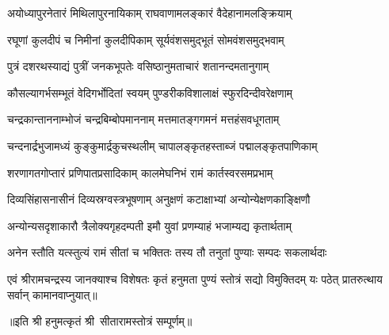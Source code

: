 
\twolineshloka
{अयोध्यापुरनेतारं मिथिलापुरनायिकाम्}
{राघवाणामलङ्कारं वैदेहानामलङ्क्रियाम्}

\twolineshloka
{रघूणां कुलदीपं च निमीनां कुलदीपिकाम्}
{सूर्यवंशसमुद्भूतं सोमवंशसमुद्भवाम्}

\twolineshloka
{पुत्रं दशरथस्याद्यं पुत्रीं जनकभूपतेः}
{वसिष्ठानुमताचारं शतानन्दमतानुगाम्}

\twolineshloka
{कौसल्यागर्भसम्भूतं वेदिगर्भोदितां स्वयम्}
{पुण्डरीकविशालाक्षं स्फुरदिन्दीवरेक्षणाम्}

\twolineshloka
{चन्द्रकान्ताननाम्भोजं चन्द्रबिम्बोपमाननाम्}
{मत्तमातङ्गगमनं मत्तहंसवधूगताम्}

\twolineshloka
{चन्दनार्द्रभुजामध्यं कुङ्कुमार्द्रकुचस्थलीम्}
{चापालङ्कृतहस्ताब्जं पद्मालङ्कृतपाणिकाम्}

\twolineshloka
{शरणागतगोप्तारं प्रणिपातप्रसादिकाम्}
{कालमेघनिभं रामं कार्तस्वरसमप्रभाम्}

\twolineshloka
{दिव्यसिंहासनासीनं दिव्यस्रग्वस्त्रभूषणाम्}
{अनुक्षणं कटाक्षाभ्यां अन्योन्येक्षणकाङ्क्षिणौ}

\twolineshloka
{अन्योन्यसदृशाकारौ त्रैलोक्यगृहदम्पती}
{इमौ युवां प्रणम्याहं भजाम्यद्य कृतार्थताम्}

\twolineshloka
{अनेन स्तौति यत्स्तुत्यं रामं सीतां च भक्तितः}
{तस्य तौ तनुतां पुण्याः सम्पदः सकलार्थदाः}

\twolineshloka
{एवं श्रीरामचन्द्रस्य जानक्याश्च विशेषतः}
{कृतं हनुमता पुण्यं स्तोत्रं सद्यो विमुक्तिदम्}
{यः पठेत् प्रातरुत्थाय सर्वान् कामानवाप्नुयात्॥}

॥इति श्री हनुमत्कृतं श्री~सीतारामस्तोत्रं सम्पूर्णम्॥